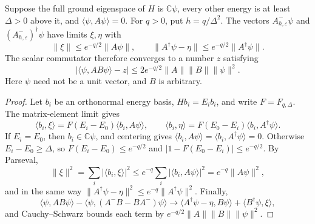 \begin{lemma}
    \label{lem:hk_gaussian_ground_frequency_separation}
    \leanok
    Suppose the full ground eigenspace of $H$ is $\mathbb C\psi$,
    every other energy is at least $\Delta>0$ above it, and
    $\langle\psi,A\psi\rangle=0$. For $q>0$, put $h=q/\Delta^2$.
    The vectors $A^-_{h,\varepsilon}\psi$ and
    $(A^-_{h,\varepsilon})^\dagger\psi$ have limits $\xi,\eta$ with
    \[
        \|\xi\|\le e^{-q/2}\|A\psi\|,
        \qquad \|A^\dagger\psi-\eta\|
        \le e^{-q/2}\|A^\dagger\psi\|.
    \]
    The scalar commutator therefore converges to a number $z$ satisfying
    \[
        |\langle\psi,AB\psi\rangle-z|
        \le 2e^{-q/2}\|A\|\|B\|\|\psi\|^2.
    \]
    Here $\psi$ need not be a unit vector, and $B$ is arbitrary.
\end{lemma}
\begin{proof}\leanok
    Let $b_i$ be an orthonormal energy basis, $Hb_i=E_ib_i$, and write
    $F=F_{q,\Delta}$. The matrix-element limit gives
    \[
        \langle b_i,\xi\rangle=F(E_i-E_0)\langle b_i,A\psi\rangle,
        \qquad
        \langle b_i,\eta\rangle=F(E_0-E_i)\langle b_i,A^\dagger\psi\rangle.
    \]
    If $E_i=E_0$, then $b_i\in\mathbb C\psi$, and centering gives
    $\langle b_i,A\psi\rangle=\langle b_i,A^\dagger\psi\rangle=0$.
    Otherwise $E_i-E_0\ge\Delta$, so $F(E_i-E_0)\le e^{-q/2}$ and
    $|1-F(E_0-E_i)|\le e^{-q/2}$. By Parseval,
    \[
        \|\xi\|^2=\sum_i|\langle b_i,\xi\rangle|^2
        \le e^{-q}\sum_i|\langle b_i,A\psi\rangle|^2
        =e^{-q}\|A\psi\|^2,
    \]
    and in the same way
    $\|A^\dagger\psi-\eta\|^2\le e^{-q}\|A^\dagger\psi\|^2$.
    Finally,
    \[
        \langle\psi,AB\psi\rangle-
        \langle\psi,(A^-B-BA^-)\psi\rangle
        \longrightarrow
        \langle A^\dagger\psi-\eta,B\psi\rangle
        +\langle B^\dagger\psi,\xi\rangle,
    \]
    and Cauchy--Schwarz bounds each term by
    $e^{-q/2}\|A\|\|B\|\|\psi\|^2$.
\end{proof}


